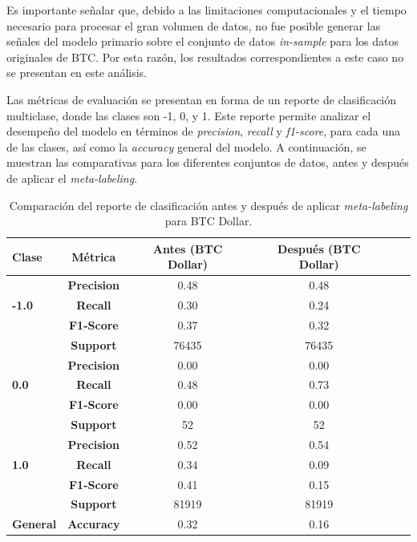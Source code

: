 \documentclass[a4paper,12pt, twoside]{report}
\begin{document}
Es importante señalar que, debido a las limitaciones computacionales y el tiempo necesario para 
procesar el gran volumen de datos, no fue posible generar las señales del modelo primario sobre el 
conjunto de datos \textit{in-sample} para los datos originales de BTC. Por esta razón, los 
resultados correspondientes a este caso no se presentan en este análisis.

Las métricas de evaluación se presentan en forma de un reporte de clasificación multiclase, donde 
las clases son -1, 0, y 1. Este reporte permite analizar el desempeño del modelo en términos de 
\textit{precision}, \textit{recall} y \textit{f1-score}, para cada una de las clases, 
así como la \textit{accuracy} general del modelo. A continuación, se muestran las comparativas 
para los diferentes conjuntos de datos, antes y después de aplicar el \textit{meta-labeling}.


\begin{table}[h!]
    \centering
    \begin{tabular}{lccccc}
    \hline
    \textbf{Clase} & \textbf{Métrica} & \textbf{Antes (BTC Dollar)} & \textbf{Después (BTC Dollar)} \\
    \hline
    \multirow{3}{*}{\textbf{-1.0}} & \textbf{Precision} & 0.48 & 0.48 \\
                                   & \textbf{Recall}    & 0.30 & 0.24 \\
                                   & \textbf{F1-Score}  & 0.37 & 0.32 \\
                                   & \textbf{Support}   & 76435 & 76435 \\
    \hline
    \multirow{3}{*}{\textbf{0.0}} & \textbf{Precision}  & 0.00 & 0.00 \\
                                  & \textbf{Recall}     & 0.48 & 0.73 \\
                                  & \textbf{F1-Score}   & 0.00 & 0.00 \\
                                  & \textbf{Support}    & 52 & 52 \\
    \hline
    \multirow{3}{*}{\textbf{1.0}} & \textbf{Precision}  & 0.52 & 0.54 \\
                                  & \textbf{Recall}     & 0.34 & 0.09 \\
                                  & \textbf{F1-Score}   & 0.41 & 0.15 \\
                                  & \textbf{Support}    & 81919 & 81919 \\
    \hline
    \textbf{General} & \textbf{Accuracy} & 0.32 & 0.16 \\
    \hline
    \end{tabular}
    \caption{Comparación del reporte de clasificación antes y después de aplicar \textit{meta-labeling} para BTC Dollar.}
    \label{tab:classification_report_btc_dollar}
\end{table}
\end{document}

